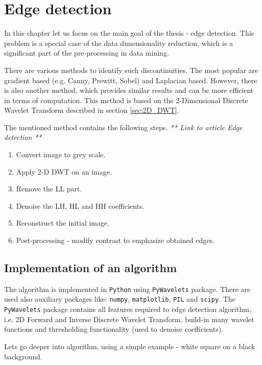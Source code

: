 \chapter{Edge detection} 
\label{ch:edge_detection}

In this chapter let us focus on the main goal of the thesis - edge detection. This problem is a special case of the data dimensionality reduction, which is a significant part of the pre-processing in data mining.


There are various methods to identify such discontinuities. The most popular are gradient based (e.g. Canny, Prewitt, Sobel) and Laplacian based. However, there is also another method, which provides similar results and can be more efficient in terms of computation. This method is based on the 2-Dimensional Discrete Wavelet Transform described in section \ref{sec:2D_DWT}. \newline

The mentioned method contains the following steps. \textit{** Link to article Edge detection **}
\begin{enumerate}
\item Convert image to grey scale.
\item Apply 2-D DWT on an image.
\item Remove the LL part.
\item Denoise the LH, HL and HH coefficients.
\item Reconstruct the initial image.
\item Post-processing - modify contrast to emphasize obtained edges.
\end{enumerate}

\section{Implementation of an algorithm}
\label{sec:implementation}

The algorithm is implemented in \texttt{Python} using \texttt{PyWavelets} package. There are used also auxiliary packages like: \texttt{numpy}, \texttt{matplotlib}, \texttt{PIL} and \texttt{scipy}. The \texttt{PyWavelets} package contains all features required to edge detection algorithm, i.e. 2D Forward and Inverse Discrete Wavelet Transform, build-in many wavelet functions and thresholding functionality (used to denoise coefficients).

Lets go deeper into algorithm, using a simple example - white square on a black background.

